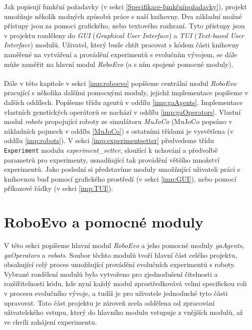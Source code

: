 Jak popisují funkční požadavky (v sekci \ref{Specifikace-funkčnípožadavky}),
projekt umožňuje několik možných způsobů práce s naší knihovny. Dva základní
možné přístupy jsou za pomoci grafického, nebo textového rozhraní. Tyto
přístupy jsou v projektu rozděleny do \emph{GUI} (\emph{Graphical User
Interface}) a \emph{TUI} (\emph{Text-based User Interface}) modulů. Uživatel,
který bude chtít pracovat s kódem části knihovny zaměřené na vytváření a
provádění experimentů s evolučním vývojem, se dále může zaměřit na hlavní modul
\emph{RoboEvo} (a s ním spojené pomocné moduly).

\paragraph{} 
Dále v této kapitole v sekci \ref{imp:roboevo} popíšeme centrální modul
\emph{RoboEvo} pracující s několika dalšími pomocnými moduly, jejichž
implementace popíšeme v dalších oddílech. Popíšeme třídu agentů v oddílu
\ref{imp:gaAgents}. Implementace vlastních genetických operátorů se nachází v
oddílu \ref{imp:gaOperators}. Vlastní modul \emph{robots} propojující roboty ze
simulátoru \emph{MuJoCo} (MuJoCo popsáno v základních pojmech v oddílu
\ref{MuJoCo}) s ostatními třídami je vysvětlena (v oddílu \ref{imp:robots}). V
sekci \ref{imp:experimentsetter} předvedeme třídu \texttt{Experiment} modulu
\emph{experiment\_setter}, sloužící k uchování a předvolbě parametrů pro
experimenty, usnadňující tak provádění většího množství experimentů. Jako
poslední si představíme moduly umožňující uživateli práci s knihovnou buď
pomocí grafického prostředí (v sekci \ref{imp:GUI}), nebo pomocí příkazové
řádky (v sekci \ref{imp:TUI}). 

\section{RoboEvo a pomocné moduly}
V této sekci popíšeme hlavní modul \emph{RoboEvo} a jeho pomocné moduly
\linebreak \emph{gaAgents}, \emph{gaOperators} a \emph{robots}. Soubor těchto
modulů tvoří hlavní část celého projektu, obsahující celý proces umožňující
provádění evolučních experimentů s roboty. Vybrané rozdělení modulů bylo
vytvořeno pro zjednodušení čitelnosti a rozšířitelnosti kódu, kde nyní každý
modul zprostředkovává velmi specifickou roli v procesu evolučního vývoje, a
tudíž je pro uživatele jednoduché tyto části upravovat. Tato část projektu je
zároveň zcela oddělena od zpracování uživatelského vstupu, který do hlavního
modulu vstupuje z vnějších modulů, až ve chvíli zahájení experimentu. 

